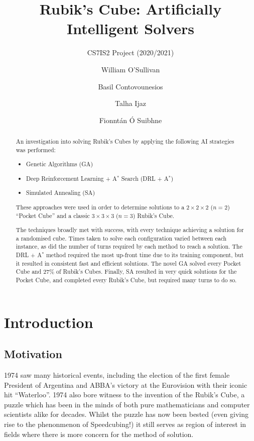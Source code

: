 \documentclass[UKenglish]{svproc}
\title{Rubik's Cube: Artificially Intelligent Solvers}
\subtitle{CS7IS2 Project (2020/2021)}
\author{
  William O'Sullivan   \and
  Basil Contovounesios \and
  Talha Ijaz           \and
  Fionnt\'an \'O Suibhne}
\institute{\email{
    wosulliv@tcd.ie,
    contovob@tcd.ie,
    ijazm@tcd.ie,
    suibhnef@tcd.ie}}
\begin{document}
\mainmatter
\maketitle              %

\begin{abstract}

An investigation into solving Rubik's Cubes by applying the following AI strategies was performed:
\begin{itemize}
    \item Genetic Algorithms (GA)
    \item Deep Reinforcement Learning + A$^{\ast}$ Search (DRL + A$^{\ast}$)
    \item Simulated Annealing (SA)
\end{itemize}
These approaches were used in order to determine solutions to a $2\times 2\times 2$ ($n=2$) ``Pocket Cube'' and a classic $3\times 3\times 3$ ($n=3$) Rubik's Cube.

The techniques broadly met with success, with every technique achieving a solution for a randomised cube. Times taken to solve each configuration varied between each instance, as did the number of turns required by each method to reach a solution. The DRL + A$^{\ast}$ method required the most up-front time due to its training component, but it resulted in consistent fast and efficient solutions. The novel GA solved every Pocket Cube and 27\% of Rubik's Cubes. Finally, SA resulted in very quick solutions for the Pocket Cube, and completed every Rubik's Cube, but required many turns to do so.


\end{abstract}

\section{Introduction}

\subsection{Motivation}
1974 saw many historical events, including the election of the first female President of Argentina and ABBA's victory at the Eurovision with their iconic hit ``Waterloo''. 1974 also bore witness to the invention of the Rubik's Cube, a puzzle which has been in the minds of both pure mathematicians and computer scientists alike for decades. Whilst the puzzle has now been bested (even giving rise to the phenonmenon of Speedcubing!) it still serves as region of interest in fields where there is more concern for the method of solution.
\end{document}
